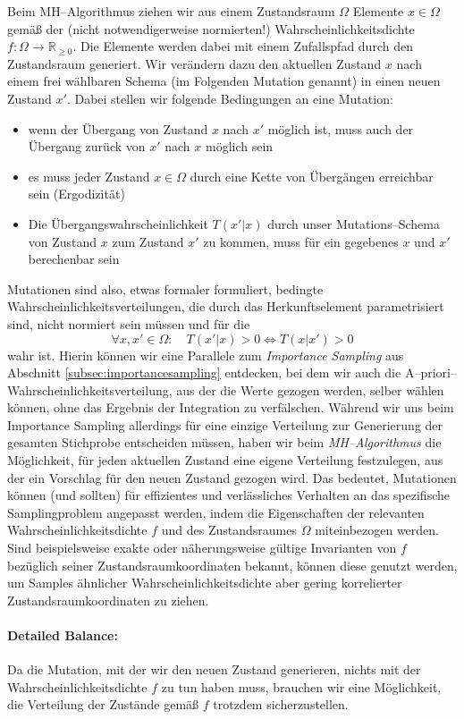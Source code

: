 	Beim MH--Algorithmus ziehen wir aus einem Zustandsraum $\Omega$ Elemente $x \in \Omega$ gemäß der (nicht notwendigerweise normierten!) Wahrscheinlichkeitsdichte $f : \Omega \rightarrow \mathbb{R}_{\geq 0}$. Die Elemente werden dabei mit einem Zufallspfad durch den Zustandsraum generiert. Wir verändern dazu den aktuellen Zustand $x$ nach einem frei wählbaren Schema (im Folgenden Mutation genannt) in einen neuen Zustand $x'$.
	Dabei stellen wir folgende Bedingungen an eine Mutation:
	\begin{itemize}
		\item{wenn der Übergang von Zustand $x$ nach $x'$ möglich ist, muss auch der Übergang zurück von $x'$ nach $x$ möglich sein}
		\item{es muss jeder Zustand $x \in \Omega$ durch eine Kette von Übergängen erreichbar sein (Ergodizität)}
		\item{Die Übergangswahrscheinlichkeit $T(x'|x)$ durch unser Mutations--Schema von Zustand $x$ zum Zustand $x'$ zu kommen, muss für ein gegebenes $x$ und $x'$ berechenbar sein}
	\end{itemize}
	Mutationen sind also, etwas formaler formuliert, bedingte Wahrscheinlichkeitsverteilungen, die durch das Herkunftselement parametrisiert sind, nicht normiert sein müssen und für die
	$$\forall x,x'\in\Omega : \quad T(x'|x)>0 \Leftrightarrow T(x|x')>0$$
	wahr ist. Hierin können wir eine Parallele zum {\em Importance Sampling} aus Abschnitt \ref{subsec:importancesampling} entdecken, bei dem wir auch die A--priori--Wahr\-schein\-lich\-keits\-ver\-tei\-lung, aus der die Werte gezogen werden, selber wählen können, ohne das Ergebnis der Integration zu verfälschen. Während wir uns beim Importance Sampling allerdings für eine einzige Verteilung zur Generierung der gesamten Stichprobe entscheiden müssen, haben wir beim {\em MH--Algorithmus} die Möglichkeit, für jeden aktuellen Zustand eine eigene Verteilung festzulegen, aus der ein Vorschlag für den neuen Zustand gezogen wird.
	Das bedeutet, Mutationen können (und sollten) für effizientes und verlässliches Verhalten an das spezifische Samplingproblem angepasst werden, indem die Eigenschaften der relevanten Wahrscheinlichkeitsdichte $f$ und des Zustandsraumes $\Omega$ miteinbezogen werden. Sind beispielsweise exakte oder näherungsweise gültige Invarianten von $f$ bezüglich seiner Zustandsraumkoordinaten bekannt, können diese genutzt werden, um Samples ähnlicher Wahrscheinlichkeitsdichte aber gering korrelierter Zustandsraumkoordinaten zu ziehen.
	
		
	\paragraph{Detailed Balance:}
	Da die Mutation, mit der wir den neuen Zustand generieren, nichts mit der Wahrscheinlichkeitsdichte $f$ zu tun haben muss, brauchen wir eine Möglichkeit, die Verteilung der Zustände gemäß $f$ trotzdem sicherzustellen.
	
